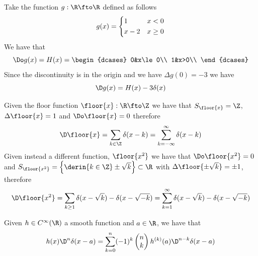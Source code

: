 \documentclass[../mmf.tex]{subfiles}
\begin{document}
\begin{eg}
	Take the function $g:\R\fto\R$ defined as follows
	\begin{equation*}
		g(x)=\begin{dcases}
			1&x<0\\
			x-2&x\ge0
		\end{dcases}
	\end{equation*}
	We have that
	\begin{equation*}
		\Do g(x)=H(x)=\begin{dcases}
			0&x\le0\\
			1&x>0\\
		\end{dcases}
	\end{equation*}
	Since the discontinuity is in the origin and we have $\Delta g(0)=-3$ we have
	\begin{equation*}
		\D g(x)=H(x)-3\delta(x)
	\end{equation*}
\end{eg}
\begin{eg}
	Given the floor function $\floor{x}:\R\fto\Z$ we have that $S_{\floor{x}}=\Z$, $\Delta\floor{x}=1$ and $\Do\floor{x}=0$ therefore
	\begin{equation*}
		\D\floor{x}=\sum_{k\in\Z}\delta(x-k)=\sum_{k=-\infty}^\infty\delta(x-k)
	\end{equation*}
	Given instead a different function, $\floor{x^2}$ we have that $\Do\floor{x^2}=0$ and $S_{\floor{x^2}}=\left\{\derin{k\in\Z} \pm\sqrt{k} \right\}\subset\R$ with $\Delta\floor{\pm\sqrt{k}}=\pm1$, therefore
	\begin{equation*}
		\D\floor{x^2}=\sum_{k\ge1}\delta(x-\sqrt{k})-\delta(x-\sqrt{-k})=\sum_{k=1}^{\infty}\delta(x-\sqrt{k})-\delta(x-\sqrt{-k})
	\end{equation*}
\end{eg}
\begin{thm}
	Given $h\in C^\infty(\R)$ a smooth function and $a\in\R$, we have that
	\begin{equation*}
		h(x)\D^n\delta(x-a)=\sum_{k=0}^{n}(-1)^k\begin{pmatrix}n\\k\end{pmatrix}h^{(k)}(a)\D^{n-k}\delta(x-a)
	\end{equation*}
\end{thm}
\end{document}
